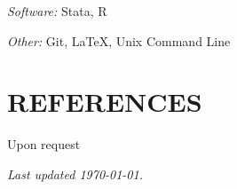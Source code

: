 \documentclass[letterpaper]{article}
\renewenvironment{itemize}{
  \begin{list}{}{
    \setlength{\leftmargin}{1.5em}
  }
}{
  \end{list}
}
\begin{document}
\begin{itemize}
    \item \textit{Software:} \hspace{10pt} Stata, R
    
    \item \textit{Other:} \hspace{22pt} Git, LaTeX, Unix Command Line 
\end{itemize}


\section*{REFERENCES}

\begin{itemize}
    \item Upon request
\end{itemize}

\bigskip

\vfill 
\begin{itemize}
    \item \emph{Last updated {\today}.}
\end{itemize}
\end{document}
